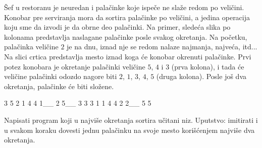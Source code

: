 \begin{Exercise}[difficulty=2, label=516]
  Šef u restoranu je neuredan i palačinke koje ispeče ne slaže redom
  po veličini. Konobar pre serviranja mora da sortira palačinke po
  veličini, a jedina operacija koju sme da izvodi je da obrne deo
  palačinki. Na primer, sledeća slika po kolonama predstavlja
  naslagane palačinke posle svakog okretanja. Na početku, palačinka
  veličine $2$ je na dnu, iznad nje se redom nalaze najmanja, najveća,
  itd... Na slici crtica predstavlja mesto iznad koga će konobar
  okrenuti palačinke. Prvi potez konobara je okretanje palačinki
  veličine $5$, $4$ i $3$ (prva kolona), i tada će veličine palačinki
  odozdo nagore biti $2$, $1$, $3$, $4$, $5$ (druga kolona). Posle još
  dva okretanja, palačinke će biti složene.
\begin{ckod}
    3    5    2    1
    4    4    1__  2
    5__  3    3    3
    1    1    4    4
    2    2__  5    5
\end{ckod}
Napisati program koji u najviše  okretanja sortira učitani
niz. Uputstvo: imitirati  i u svakom koraku
dovesti jednu palačinku na svoje mesto korišćenjem najviše dva
okretanja.
    
\end{Exercise}

